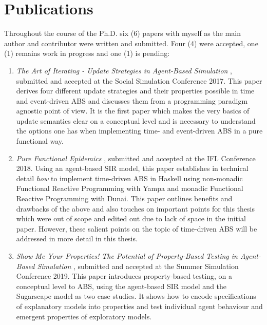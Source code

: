 \section*{Publications}
Throughout the course of the Ph.D. six (6) papers with myself as the main author and contributor were written and submitted. Four (4) were accepted, one (1) remains work in progress and one (1) is pending:

\begin{enumerate}
	\item \textit{The Art of Iterating - Update Strategies in Agent-Based Simulation} \cite{thaler_art_2017}, submitted and accepted at the Social Simulation Conference 2017. This paper derives four different update strategies and their properties possible in time and event-driven ABS and discusses them from a programming paradigm agnostic point of view. It is the first paper which makes the very basics of update semantics clear on a conceptual level and is necessary to understand the options one has when implementing time- and event-driven ABS in a pure functional way.
	
	\item \textit{Pure Functional Epidemics} \cite{thaler_pure_2018}, submitted and accepted at the IFL Conference 2018. Using an agent-based SIR model, this paper establishes in technical detail \textit{how} to implement time-driven ABS in Haskell using non-monadic Functional Reactive Programming with Yampa and monadic Functional Reactive Programming with Dunai. This paper outlines benefits and drawbacks of the above and also touches on important points for this thesis which were out of scope and edited out due to lack of space in the initial paper. However, these salient points on the topic of time-driven ABS will be addressed in more detail in this thesis.

	\item \textit{Show Me Your Properties! The Potential of Property-Based Testing in Agent-Based Simulation} \cite{thaler_show_2019}, submitted and accepted at the Summer Simulation Conference 2019. This paper introduces property-based testing, on a conceptual level to ABS, using the agent-based SIR model and the Sugarscape model as two case studies. It shows how to encode specifications of explanatory models into properties and test individual agent behaviour and emergent properties of exploratory models.
	

\end{enumerate}
